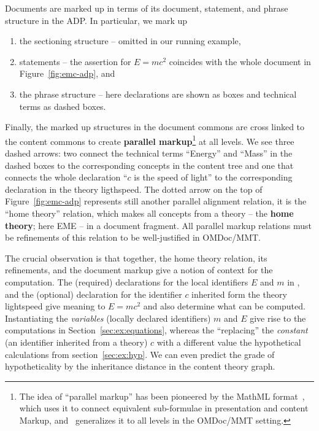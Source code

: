 Documents are marked up in terms of its document, statement, and phrase structure in the
ADP. In particular, we mark up
\begin{enumerate}
\item the sectioning structure -- omitted in our running example, 
\item statements -- the assertion for $E=mc^2$ coincides with the whole document
   in Figure~\ref{fig:emc-adp}, and
\item the phrase structure -- here declarations are shown as boxes and technical terms as
  dashed boxes.
\end{enumerate}
Finally, the marked up structures in the document commons are cross linked to the content
commons to create \textbf{parallel markup}\footnote{The idea of ``parallel markup'' has
  been pioneered by the MathML format~\cite{CarlisleEd:MathML3:base}, which uses it to
  connect equivalent sub-formulae in presentation and content Markup, and~\cite{Iancu:phd}
  generalizes it to all levels in the OMDoc/MMT setting.} at all levels. We see three
dashed arrows: two connect the technical terms ``Energy'' and ``Mass'' in the dashed boxes
to the corresponding concepts in the content tree and one that connects the whole
declaration ``$c$ is the speed of light'' to the corresponding declaration in the theory
\textsf{ligthspeed}. The dotted arrow on the top of Figure~\ref{fig:emc-adp} represents
still another parallel alignment relation, it is the ``home theory'' relation, which makes
all concepts from a theory -- the \textbf{home theory}; here \textsf{EME} -- in a document
fragment. All parallel markup relations must be refinements of this relation to be
well-justified in OMDoc/MMT.

The crucial observation is that together, the home theory relation, its refinements, and
the document markup give a notion of context for the computation. The (required)
declarations for the local identifiers $E$ and $m$ in , and the
(optional) declaration for the identifier $c$ inherited form the theory
\textsf{lightspeed} give meaning to $E=mc^2$ and also determine what can be
computed. Instantiating the \emph{variables} (locally declared identifiers) $m$ and $E$
give rise to the computations in Section~\ref{sec:ex:equations}, whereas the ``replacing''
the \emph{constant} (an identifier inherited from a theory) $c$ with a different value the
hypothetical calculations from section~\ref{sec:ex:hyp}. We can even predict the grade of
hypotheticality by the inheritance distance in the content theory graph.

